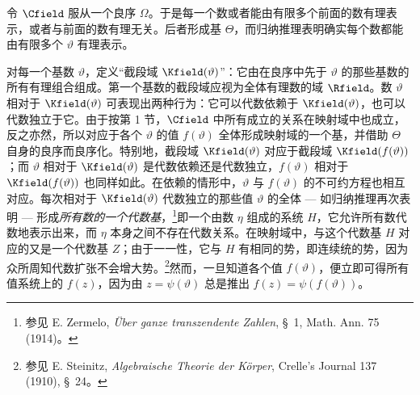 令 $\Cfield$ 服从一个良序 $\Omega$。于是每一个数或者能由有限多个前面的数有理表示，或者与前面的数有理无关。后者形成基 $\Theta$，而归纳推理表明确实每个数都能由有限多个 $\vartheta$ 有理表示。

对每一个基数 $\vartheta$，定义“截段域 $\Kfield(\vartheta)$”：它由在良序中先于 $\vartheta$ 的那些基数的所有有理组合组成。第一个基数的截段域应视为全体有理数的域 $\Rfield$。数 $\vartheta$ 相对于 $\Kfield(\vartheta)$ 可表现出两种行为：它可以代数依赖于 $\Kfield(\vartheta)$，也可以代数独立于它。由于按第 1 节，$\Cfield$ 中所有成立的关系在映射域中也成立，反之亦然，所以对应于各个 $\vartheta$ 的值 $f(\vartheta)$ 全体形成映射域的一个基，并借助 $\Theta$ 自身的良序而良序化。特别地，截段域 $\Kfield(\vartheta)$ 对应于截段域 $\Kfield(f(\vartheta))$；而 $\vartheta$ 相对于 $\Kfield(\vartheta)$ 是代数依赖还是代数独立，$f(\vartheta)$ 相对于 $\Kfield(f(\vartheta))$ 也同样如此。在依赖的情形中，$\vartheta$ 与 $f(\vartheta)$ 的不可约方程也相互对应。每次相对于 $\Kfield(\vartheta)$ 代数独立的那些值 $\vartheta$ 的全体 --- 如归纳推理再次表明 --- 形成\emph{所有数的一个代数基}，\footnote{参见 E. Zermelo, \emph{Über ganze transzendente Zahlen}, \S\ 1, Math. Ann. 75 (1914)。}即一个由数 $\eta$ 组成的系统 $H$，它允许所有数代数地表示出来，而 $\eta$ 本身之间不存在代数关系。在映射域中，与这个代数基 $H$ 对应的又是一个代数基 $Z$；由于一一性，它与 $H$ 有相同的势，即连续统的势，因为众所周知代数扩张不会增大势。\footnote{参见 E. Steinitz, \emph{Algebraische Theorie der Körper}, Crelle's Journal 137 (1910), \S\ 24。}然而，一旦知道各个值 $f(\vartheta)$，便立即可得所有值系统上的 $f(z)$，因为由 $z=\psi(\vartheta)$ 总是推出 $f(z)=\psi(f(\vartheta))$。

\medskip
